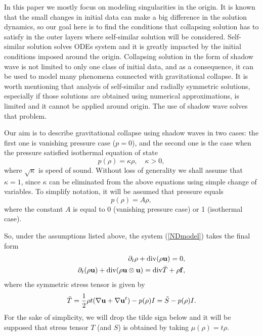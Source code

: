 \documentclass[reqno]{article}%
\theoremstyle{plain}
\theoremstyle{definition}
\theoremstyle{remark}
\renewcommand{\div}{{\rm div} }
\numberwithin{equation}{section}
\begin{document}
 In this paper we mostly focus on  modeling singularities in the origin. It is known that the small changes in initial data can make a big difference in the solution dynamics, so our goal here is to find the conditions that collapsing solution has to satisfy in the outer layers where self-similar solution will be considered. Self-similar solution solves  ODEs system and it is greatly impacted by the initial conditions imposed around the origin. Collapsing solution in the form of shadow wave is not limited to only one class of initial data, and as a consequence, it can be used to model many phenomena connected with gravitational collapse. It is worth mentioning that analysis of self-similar and radially symmetric  solutions, especially if those  solutions are obtained using numerical approximations, is limited and it cannot be applied around origin. The use of shadow wave solves that problem.


 Our aim is  to describe gravitational collapse using shadow waves in two cases: the first one is vanishing pressure case ($p=0$), and the second one is the case when the pressure satisfied isothermal equation of state 
 \[p(\rho)=\kappa \rho, \quad \kappa>0,\]
 where $\sqrt{\kappa}$ is speed of sound.
 Without loss of generality we shall assume that $\kappa=1$, since $\kappa$ can be eliminated from the above equations using simple change of variables. To simplify notation, it will be assumed that pressure equals
 \[p(\rho)=A \rho,\]
 where the constant $A$ is equal to 0 (vanishing pressure case) or 1 (isothermal case).
 
 




So, under the assumptions listed above, the system (\ref{NDmodel}) takes the final form
\begin{equation}\label{3Dmodel}
\begin{split}
\partial_t \rho +\div (\rho {\bf u})=0,\\
\partial_t (\rho {\bf u})+\div (\rho {\bf u}\otimes {\bf u})=\div \tilde{T} +\rho {\bf f} ,
\end{split}
\end{equation}
where the symmetric stress tensor is given by
\[\tilde{T}=\frac{1}{2}\rho t(\nabla {\bf u}+\nabla {\bf u}^t)-p(\rho)I=\tilde{S}-p(\rho)I.\]
For the sake of simplicity, we will drop the tilde sign below and it will be supposed  that stress tensor $T$ (and $S$) is obtained by taking $\mu(\rho)=t\rho.$ 
\medskip
\end{document}
